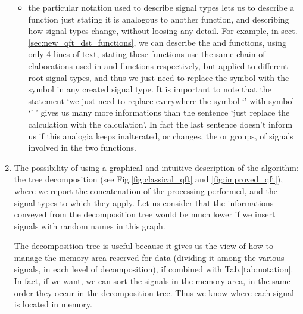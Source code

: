 \documentclass[a4paper,10pt]{article}
\begin{document}
\begin{enumerate}
\begin{itemize}
\item
the particular notation used to describe signal types lets us to describe a function just stating it is analogous to another function, and describing how signal types change, without loosing any detail. 
For example, in sect. \ref{sec:new_qft_dst_functions}, we can describe the  and  functions, using only 4 lines of text, stating these functions use the same chain of elaborations used in  and  functions respectively, but applied to different root signal types, and thus we just need to replace the symbol  with the symbol  in any created signal type.
It is important to note that the statement `we just need to replace everywhere the symbol `' with symbol `' ' gives us many more informations than the sentence `just replace the  calculation with the  calculation'.
In fact the last sentence doesn't inform us if this analogia keeps inalterated, or changes, the  or  groups, of signals involved in the two functions. 

\end{itemize}

\item
The possibility of using a graphical and intuitive description of the algorithm: the tree decomposition (see Fig.\ref{fig:classical_qft} and \ref{fig:improved_qft}), where we report the concatenation of the processing performed, and the signal types to which they apply.
Let us consider that the informations conveyed from the decomposition tree would be much lower if we insert signals with random names in this graph.

The decomposition tree is useful because it gives us the view of how to manage the memory area reserved for data (dividing it among the various signals, in each level of decomposition), if combined with Tab.\ref{tab:notation}. 
In fact, if we want, we can sort the signals in the memory area, in the same order they occur in the decomposition tree. Thus we know where each signal is located in memory.



\end{enumerate}
\end{document}
